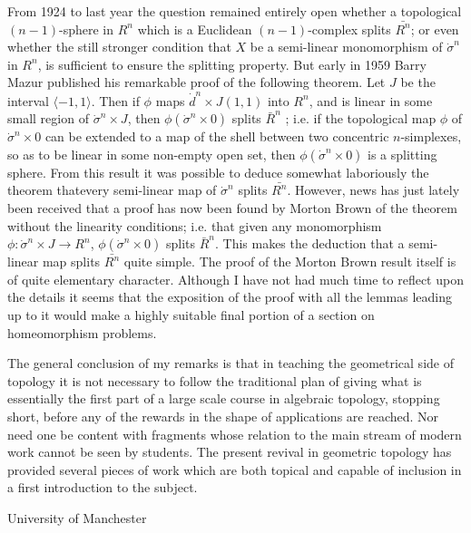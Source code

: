 From 1924 to last year the question remained entirely open whether a
topological $(n-1)$-sphere in $R^n$ which is a Euclidean
$(n-1)$-complex splits $\bar{R^n}$; or even whether the still stronger
condition that $X$ be a semi-linear monomorphism of $\dot{\sigma}^n$
in $R^n$, is sufficient to ensure the splitting property. But early in
1959 Barry Mazur published his remarkable proof of the following
theorem.  Let $J$ be the interval $\langle -1, 1\rangle$. Then if
$\phi$ maps $\dot{d}^n \times J (1,1)$ into  $R^n$, and is linear in
some small region of $\dot{\sigma}^n \times J$, then
$\phi(\dot{\sigma}^n \times 0)$ splits $\bar{R}^n$ ; i.e. if the
topological map $\phi$ of $\dot{\sigma}^n \times 0$ can be extended to
a map of the shell between two concentric $n$-simplexes, so as to be
linear in some non-empty open set, then $\phi (\dot{\sigma}^n \times
0)$ is a splitting sphere. From this result it was possible to deduce
somewhat laboriously the theorem that\pageoriginale every semi-linear
map of $\dot{\sigma}^n$ splits $\bar{R^n}$. However, news has just
lately been received that a proof has now been found by Morton Brown
of the theorem without the linearity conditions; i.e. that given any
monomorphism $\phi : \dot{\sigma}^n \times J \to R^n$, $\phi
(\dot{\sigma}^n \times 0)$ splits $\bar{R}^n$. This makes the
deduction that a semi-linear map splits $\bar{R^n}$ quite simple. The
proof of the Morton Brown result itself is of quite elementary
character. Although I have not had much time to reflect upon the
details it seems that the exposition of the proof with all the lemmas
leading up to it would make a highly suitable final portion of a
section on homeomorphism problems.

The general conclusion of my remarks is that in teaching the
geometrical side of topology it is not necessary to follow the
traditional plan of giving what is essentially the first part of a
large scale course in algebraic topology, stopping short, before any
of the rewards in the shape of applications are reached. Nor need one
be content with fragments whose relation to the main stream of modern
work cannot be seen by students. The present revival in geometric
topology has provided several pieces of work which are both topical
and capable of inclusion in a first introduction to the subject.


\bigskip
\bigskip

{\fontsize{9pt}{11pt}\selectfont
University of Manchester}\relax
